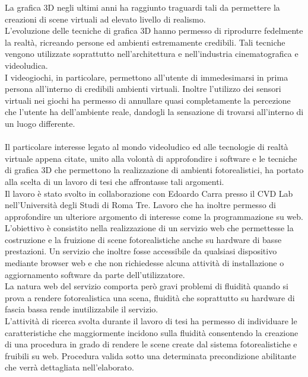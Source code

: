 La grafica 3D negli ultimi anni ha raggiunto traguardi tali da permettere la creazioni di scene virtuali ad elevato livello di realismo.
\\
L’evoluzione delle tecniche di grafica 3D hanno permesso di riprodurre fedelmente la realtà, ricreando persone ed ambienti estremamente credibili. Tali tecniche vengono utilizzate soprattutto nell’architettura e nell’industria cinematografica e videoludica.
\\
I videogiochi, in particolare, permettono all’utente di immedesimarsi in prima persona all’interno di credibili ambienti virtuali. Inoltre l’utilizzo dei sensori virtuali nei giochi ha permesso di annullare quasi completamente la percezione che l’utente ha dell’ambiente reale, dandogli la sensazione di trovarsi all’interno di un luogo differente.
\\
\\
Il particolare interesse legato al mondo videoludico ed alle tecnologie di realtà virtuale appena citate, unito alla volontà di approfondire i software e le tecniche di grafica 3D che permettono la realizzazione di ambienti fotorealistici, ha portato alla scelta di un lavoro di tesi che affrontasse tali argomenti.
\\
Il lavoro è stato svolto in collaborazione con Edoardo Carra presso il CVD Lab nell’Università degli Studi di Roma Tre. Lavoro che ha inoltre permesso di approfondire un ulteriore argomento di interesse come la programmazione su web.
\\
L’obiettivo è consistito nella realizzazione di un servizio web che permettesse la costruzione e la fruizione di scene fotorealistiche anche su hardware di basse prestazioni.
Un servizio che inoltre fosse accessibile da qualsiasi dispositivo mediante browser web e che non richiedesse alcuna attività di installazione o aggiornamento software da parte dell’utilizzatore.
\\
La natura web del servizio comporta però gravi problemi di fluidità quando si prova a rendere fotorealistica una scena, fluidità che soprattutto su hardware di fascia bassa rende inutilizzabile il servizio.
\\
L’attività di ricerca svolta durante il lavoro di tesi ha permesso di individuare le caratteristiche che maggiormente incidono sulla fluidità consentendo la creazione di una procedura in grado di rendere le scene create dal sistema fotorealistiche e fruibili su web.
Procedura valida sotto una determinata precondizione abilitante che verrà dettagliata nell’elaborato.
\\
